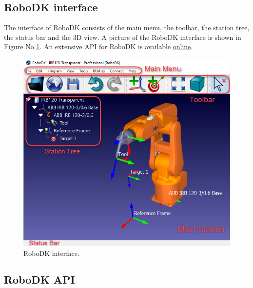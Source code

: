 \subsection{RoboDK interface}

The interface of RoboDK consists of the main menu, the toolbar, the station tree, the status bar and the 3D view. A picture of the RoboDK interface is shown in Figure No \ref{fig:robodkinterface}. An extensive API for RoboDK is available \href{https://robodk.com/doc/en/Basic-Guide.html#Start}{online}.


\begin{figure}[h]
    \centering
    \includegraphics[width=0.9\linewidth]{img/robodk_interface.png}
    \caption{RoboDK interface.}
    \label{fig:robodkinterface}
\end{figure}

\subsection{RoboDK API}
